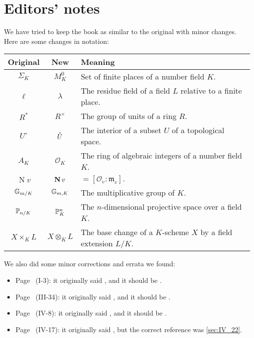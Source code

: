 \chapter*{Editors' notes}
We have tried to keep the book as similar to the original with minor changes.
Here are some changes in notation:
\begin{longtable}{|c|c|p{9cm}|}
	\hline
	\textbf{Original} & \textbf{New} & \textbf{Meaning} \\
	\hline
	\endhead

	\hline
	\endfoot

	$\Sigma_K$ & $M_K^0$ & Set of finite places of a number field $K$. \\
	$\ell$ & $\lambda$ & The residue field of a field $L$ relative to a finite place. \\
	$R^*$ & $R^\times$ & The group of units of a ring $R$. \\
	$U^\circ$ & $\mathring{U}$ & The interior of a subset $U$ of a topological space. \\
	$A_K$ & $\mathcal{O}_K$ & The ring of algebraic integers of a number field $K$. \\
	$\operatorname{N} v$ & $\operatorname{\mathbf{N}} v$ & ${} = [\mathcal{O}_v : \mathfrak{m}_v].$ \\
	$\mathbb{G}_{m/K}$ & $\mathbb{G}_{m, K}$ & The multiplicative group of $K$. \\
	$\mathbb{P}_{n/K}$ & $\mathbb{P}^n_K$ & The $n$-dimensional projective space over a field $K$. \\
	$X \times_K L$ & $X \otimes_K L$ & The base change of a $K$-scheme $X$ by a field extension $L/K$. \\
\end{longtable}

We also did some minor corrections and errata we found:
\begin{itemize}
\item Page~\pageref{errata:t't} (I-3):
	it originally said , and it should be
	.
\item Page~\pageref{errata:An+k} (III-34):
	it originally said , and it should be
	.
\item Page~\pageref{errata:uv12} (IV-8):
	it originally said , and it
	should be .
\item Page~\pageref{errata:wrongsec} (IV-17):
	it originally said , but the
	correct reference was \ref{sec:IV_22}.
\end{itemize}

